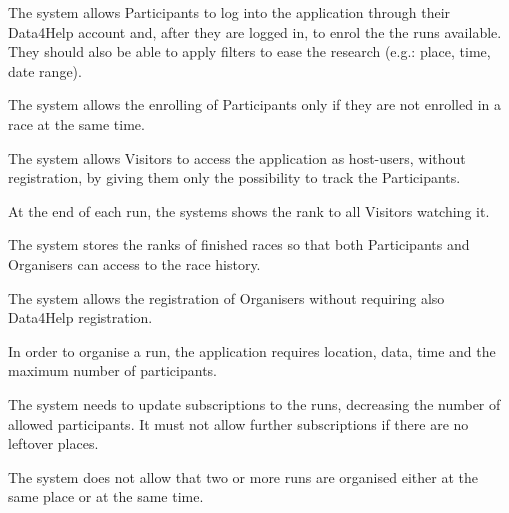 \begin{enumerate}[label={[}R3.\arabic*{]}, leftmargin=*]

    \item \label{R3-login-enrollin} The system allows Participants to log into the application through their Data4Help account and, after they are logged in, to enrol the the runs available. They should also be able to apply filters to ease the research (e.g.: place, time, date range).
    
    \item \label{R3-enrolling-different-time} The system allows the enrolling of Participants only if they are not enrolled in a race at the same time.
    
    \item \label{R3-visitors} The system allows Visitors to access the application as host-users, without registration, by giving them only the possibility to track the Participants.
    
    \item \label{R3-ranking-end} At the end of each run, the systems shows the rank to all Visitors watching it.
    
    \item \label{R3-ranking-storage} The system stores the ranks of finished races so that both Participants and Organisers can access to the race history.
    
    \item \label{R3-organizer-registration} The system allows the registration of Organisers without requiring also Data4Help registration.
    
    \item \label{R3-run-organization} In order to organise a run, the application requires location, data, time and the maximum number of participants.
    
    \item \label{R3-decreasing-participant-number} The system needs to update subscriptions to the runs, decreasing the number of allowed participants. It must not allow further subscriptions if there are no leftover places.
    
    \item \label{R3-run-different-time} The system does not allow that two or more runs are organised either at the same place or at the same time.

\end{enumerate}